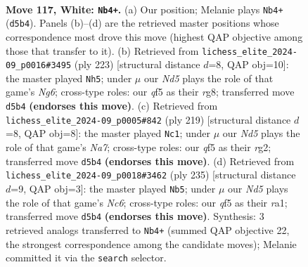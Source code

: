 \documentclass[11pt]{article}
\begin{document}
\clearpage

\begin{figure}[p]\centering
\begin{subfigure}{0.46\textwidth}\centering
\resizebox{\linewidth}{!}{%
\newchessgame
\chessboard[
  setfen={3B4/8/k7/3N1q2/2K5/8/8/8 w - - 2 117},
  showmover=false,
  pgfstyle=straightmove, color=movearrow, markmove={d5-b4}
]}
\caption{}
\end{subfigure}\hfill
\begin{subfigure}{0.46\textwidth}\centering
\resizebox{\linewidth}{!}{%
\newchessgame
\chessboard[
  setfen={6R1/8/8/8/7k/4K1n1/8/8 b - - 77 112},
  showmover=false,
  pgfstyle=straightmove, color=movearrow, markmove={g3-h5}
]}
\caption{}
\end{subfigure}
\\[4pt]
\begin{subfigure}{0.46\textwidth}\centering
\resizebox{\linewidth}{!}{%
\newchessgame
\chessboard[
  setfen={8/8/8/8/2K5/8/n5R1/1k6 b - - 69 110},
  showmover=false,
  pgfstyle=straightmove, color=movearrow, markmove={a2-c1}
]}
\caption{}
\end{subfigure}\hfill
\begin{subfigure}{0.46\textwidth}\centering
\resizebox{\linewidth}{!}{%
\newchessgame
\chessboard[
  setfen={8/8/8/8/1k6/2nK4/8/R7 b - - 96 118},
  showmover=false,
  pgfstyle=straightmove, color=movearrow, markmove={c3-b5}
]}
\caption{}
\end{subfigure}
\caption{\textbf{Move 117, White: \texttt{Nb4+}.} (a) Our position; Melanie plays \texttt{Nb4+} (\texttt{d5b4}). Panels (b)--(d) are the retrieved master positions whose correspondence most drove this move (highest QAP objective among those that transfer to it). (b) Retrieved from \texttt{lichess\_elite\_2024-09\_p0016\#3495} (ply 223) [structural distance $d$=8, QAP obj=10]: the master played \texttt{Nh5}; under $\mu$ our \emph{Nd5} plays the role of that game's \emph{Ng6}; cross-type roles: our \emph{q}f5 as their \emph{r}g8; transferred move \texttt{d5b4} \textbf{(endorses this move)}. (c) Retrieved from \texttt{lichess\_elite\_2024-09\_p0005\#842} (ply 219) [structural distance $d$=8, QAP obj=8]: the master played \texttt{Nc1}; under $\mu$ our \emph{Nd5} plays the role of that game's \emph{Na7}; cross-type roles: our \emph{q}f5 as their \emph{r}g2; transferred move \texttt{d5b4} \textbf{(endorses this move)}. (d) Retrieved from \texttt{lichess\_elite\_2024-09\_p0018\#3462} (ply 235) [structural distance $d$=9, QAP obj=3]: the master played \texttt{Nb5}; under $\mu$ our \emph{Nd5} plays the role of that game's \emph{Nc6}; cross-type roles: our \emph{q}f5 as their \emph{r}a1; transferred move \texttt{d5b4} \textbf{(endorses this move)}. Synthesis: 3 retrieved analogs transferred to \texttt{Nb4+} (summed QAP objective 22, the strongest correspondence among the candidate moves); Melanie committed it via the \texttt{search} selector.}
\label{fig:thought-m232}
\end{figure}
\end{document}
